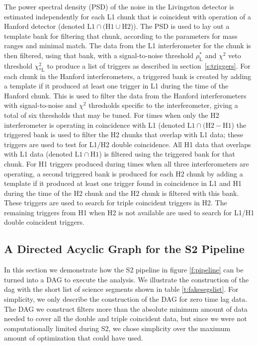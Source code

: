 The power spectral density (PSD) of the noise in the Livingston detector is
estimated independently for each L1 chunk that is coincident with operation of
a Hanford detector (denoted $\mathrm{L1} \cap (\mathrm{H1} \cup
\mathrm{H2}$)).  The PSD is used to lay out a template bank for filtering that
chunk, according to the parameters for mass ranges and minimal
match\cite{Owen:1998dk}. The data from the L1 interferometer for the chunk is
then filtered, using that bank, with a signal-to-noise threshold
$\rho_{\mathrm{L}}^\ast$ and $\chi^2$ veto threshold
$\chi^2_{\ast\mathrm{L}}$ to produce a list of triggers as described in
section~\ref{s:triggers}.  For each chunk in the Hanford interferometers, a
{triggered bank} is created by adding a template if it produced at least one
trigger in L1 during the time of the Hanford chunk.  This is used to filter
the data from the Hanford interferometers with signal-to-noise and $\chi^2$
thresholds specific to the interferometer, giving a total of six thresholds
that may be tuned.  For times when only the H2 interferometer is operating in
coincidence with L1 (denoted $\mathrm{L1} \cap (\mathrm{H2} - \mathrm{H1}$)
the triggered bank is used to filter the H2 chunks that overlap with L1 data;
these triggers are used to test for L1/H2 double coincidence.  All H1 data
that overlaps with L1 data (denoted $\mathrm{L1} \cap \mathrm{H1}$) is
filtered using the triggered bank for that chunk. For H1 triggers produced
during times when all three interferometers are operating, a second triggered
bank is produced for each H2 chunk by adding a template if it produced at
least one trigger found in coincidence in L1 and H1 during the time of the H2
chunk and the H2 chunk is filtered with this bank.  These triggers are used to
search for triple coincident triggers in H2.  The remaining triggers from H1
when H2 is not available are used to search for L1/H1 double coincident
triggers.

\subsection{A Directed Acyclic Graph for the S2 Pipeline}
\label{ss:dag}

In this section we demonstrate how the S2 pipeline in figure \ref{f:pipeline}
can be turned into a DAG to execute the analysis. We illustrate the
construction of the dag with the short list of science segments shown in table
\ref{t:fakesegslist}. For simplicity, we only describe the construction of the
DAG for zero time lag data. The DAG we construct filters more than the
absolute minimum amount of data needed to cover all the double and triple
coincident data, but since we were not computationally limited during S2, we
chose simplicity over the maximum amount of optimization that could have used.

